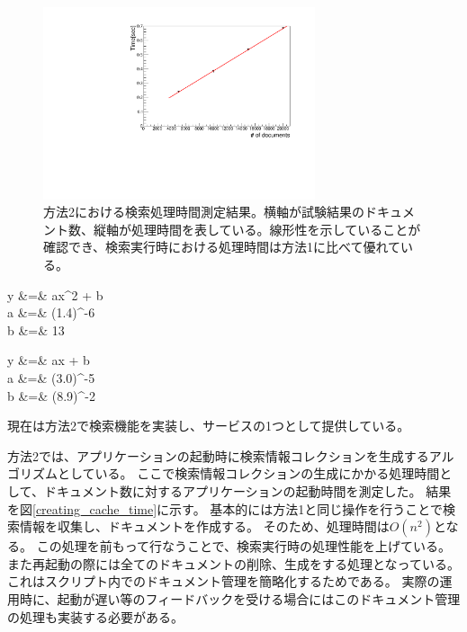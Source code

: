 \begin{figure}[bpt]
  \begin{center}
  \includegraphics[width=8cm,angle=270]{./result_mongo_collection_search.pdf}
  \caption[方法2における検索処理時間測定結果]{方法2における検索処理時間測定結果。横軸が試験結果のドキュメント数、縦軸が処理時間を表している。線形性を示していることが確認でき、検索実行時における処理時間は方法1に比べて優れている。}
  \label{searching_time}
  \end{center}
\end{figure}

\bbb
\label{function_python_list}
y &=&  ax^2 + b \\
a &=& (1.4)^{-6} \nonumber \\
b &=& 13 \nonumber
\eee

\bbb
\label{function_mongo_collection}
y &=& ax + b \\
a &=& (3.0)^{-5} \nonumber \\
b &=& (8.9)^{-2} \nonumber
\eee

現在は方法2で検索機能を実装し、サービスの1つとして提供している。


方法2では、アプリケーションの起動時に検索情報コレクションを生成するアルゴリズムとしている。
ここで検索情報コレクションの生成にかかる処理時間として、ドキュメント数に対するアプリケーションの起動時間を測定した。
結果を図\ref{creating_cache_time}に示す。
基本的には方法1と同じ操作を行うことで検索情報を収集し、ドキュメントを作成する。
そのため、処理時間は$O(n^2)$となる。
この処理を前もって行なうことで、検索実行時の処理性能を上げている。
また再起動の際には全てのドキュメントの削除、生成をする処理となっている。
これはスクリプト内でのドキュメント管理を簡略化するためである。
実際の運用時に、起動が遅い等のフィードバックを受ける場合にはこのドキュメント管理の処理も実装する必要がある。

